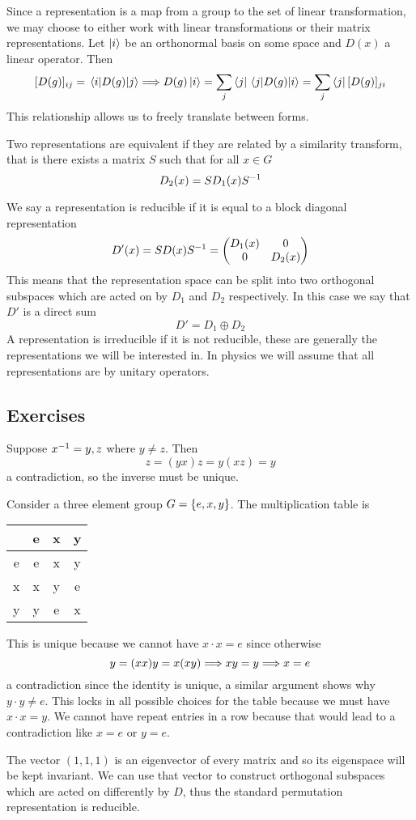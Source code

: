 Since a representation is a map from a group to the set of linear transformation, we may choose to either work with linear transformations or their matrix representations. Let $\ket{i}$ be an orthonormal basis on some space and $D(x)$ a linear operator. Then
\[ [D(g)]_{ij} = \mel{i}{D(g)}{j} \Longrightarrow D(g) \ket{i} = \sum_{j} \bra{j} \mel{j}{D(g)}{i} = \sum_j \bra{j} [D(g)]_{ji}\]
This relationship allows us to freely translate between forms.

Two representations are equivalent if they are related by a similarity transform, that is there exists a matrix $S$ such that for all $x \in G$
\[ D_2(x) = S D_1(x) {S}^{-1} \]

We say a representation is reducible if it is equal to a block diagonal representation
\[ D'(x) = S D(x) \inv S = \mqty(D_1(x) & 0 \\ 0 & D_2(x) ) \]
This means that the representation space can be split into two orthogonal subspaces which are acted on by $D_1$ and $D_2$ respectively. In this case we say that $D'$ is a direct sum
\[ D' = D_1 \oplus D_2 \]
A representation is irreducible if it is not reducible, these are generally the representations we will be interested in. In physics we will assume that all representations are by unitary operators.

\subsection{Exercises}

\begin{exercise}
	Suppose ${x}^{-1} = y, z$ where $y \neq z$. Then
	\[ z = (yx) z = y (xz) = y \]
	a contradiction, so the inverse must be unique.
\end{exercise}

\begin{exercise}
	Consider a three element group $G = \left\{e, x, y\right\}$. The multiplication table is
	\begin{center}
	\begin{tabular}{|c|ccc|}
	\hline 
	 & e & x & y \\ 
	\hline 
	e & e & x & y \\ 
	x & x & y & e \\ 
	y & y & e & x \\ 
	\hline 
	\end{tabular} 
	\end{center}
	This is unique because we cannot have $x \cdot x = e$ since otherwise
	\[ y = (xx) y = x (xy) \Longrightarrow xy = y \Longrightarrow x = e \]
	a contradiction since the identity is unique, a similar argument shows why $y \cdot y \neq e$. This locks in all possible choices for the table because we must have $x \cdot x = y$. We cannot have repeat entries in a row because that would lead to a contradiction like $x = e$ or $y = e$. 
\end{exercise}

\begin{exercise}
	The vector $(1,1,1)$ is an eigenvector of every matrix and so its eigenspace will be kept invariant. We can use that vector to construct orthogonal subspaces which are acted on differently by $D$, thus the standard permutation representation is reducible.
\end{exercise}